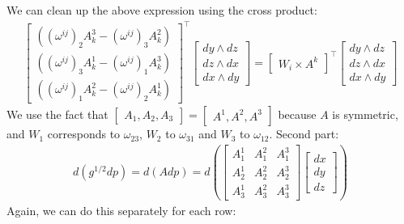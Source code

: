 \documentclass[../thesis.tex]{subfiles}
\begin{document}
We can clean up the above expression using the cross product:
\begin{align*}
  \begin{bmatrix}
    ((\omega^{ij})_2A^3_k - (\omega^{ij})_3A^2_k) \\
    ((\omega^{ij})_3A^1_k - (\omega^{ij})_1A^3_k) \\
    ((\omega^{ij})_1A^2_k - (\omega^{ij})_2A^1_k) 
  \end{bmatrix}^{\top}
  \begin{bmatrix}
    dy \wedge dz \\
    dz \wedge dx \\
    dx \wedge dy 
  \end{bmatrix} = 
  \begin{bmatrix}
    W_i \times A^k
  \end{bmatrix}^{\top}
  \begin{bmatrix}
    dy \wedge dz \\
    dz \wedge dx \\
    dx \wedge dy 
  \end{bmatrix}
\end{align*}
We use the fact that $\begin{bmatrix}
  A_1, A_2, A_3 
\end{bmatrix} = \begin{bmatrix}
  A^1, A^2, A^3
\end{bmatrix}$ because $A$ is symmetric, and $W_1$ corresponds to $\omega_{23}$, $W_2$ to $\omega_{31}$ and $W_3$ to $\omega_{12}$.
Second part:
\begin{align*}
  d(g^{1/2}dp)= d(Adp) = d\left(\begin{bmatrix}
    A^1_1 & A^2_1 & A^3_1 \\
    A^1_2 & A^2_2 & A^3_2 \\
    A^1_3 & A^2_3 & A^3_3
  \end{bmatrix}
  \begin{bmatrix}
    dx \\ dy \\ dz
  \end{bmatrix}
  \right)
\end{align*}
Again, we can do this separately for each row:
\end{document}
